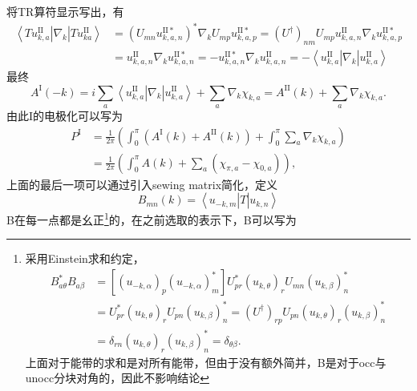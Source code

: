 \documentclass[10pt,openany]{book}
\theoremstyle{thmstyle} %
\theoremstyle{defstyle} %
\theoremstyle{prostyle} %
\begin{document}
将TR算符显示写出，有
\begin{equation*}
  \begin{aligned}
    \left\langle T u_{k, a}^{\mathrm{II}}\right| \nabla_k\left|T u_{k a}^{\mathrm{II}}\right\rangle & =\left(U_{m n} u_{k, a, n}^{\mathrm{II} *}\right)^* \nabla_k U_{m p} u_{k, a, p}^{\mathrm{II} *}=\left(U^{\dagger}\right)_{n m} U_{m p} u_{k, a, n}^{\mathrm{II}} \nabla_k u_{k, a, p}^{\mathrm{II} *} \\
    & =u_{k, a, n}^{\mathrm{II}} \nabla_k u_{k, a, n}^{\mathrm{II} *}=-u_{k, a, n}^{\mathrm{II} *} \nabla_k u_{k, a, n}^{\mathrm{II}}=-\left\langle u_{k, a}^{\mathrm{II}}\right| \nabla_k\left|u_{k, a}^{\mathrm{II}}\right\rangle
    \end{aligned}
\end{equation*}
最终
\begin{equation*}
  A^{\mathrm{I}}(-k)=i \sum_a\left\langle u_{k, a}^{\mathrm{II}}\right| \nabla_k\left|u_{k, a}^{\mathrm{II}}\right\rangle+\sum_a \nabla_k \chi_{k, a}=A^{\mathrm{II}}(k)+\sum_a \nabla_k \chi_{k, a} .
\end{equation*}
由此I的电极化可以写为
\begin{equation*}
  \begin{aligned}
    P^{\mathrm{I}} & =\frac{1}{2 \pi}\left(\int_0^\pi\left(A^{\mathrm{I}}(k)+A^{\mathrm{II}}(k)\right)+\int_0^\pi \sum_a \nabla_k \chi_{k, a}\right) \\
    & =\frac{1}{2 \pi}\left(\int_0^\pi A(k)+\sum_a\left(\chi_{\pi, a}-\chi_{0, a}\right)\right),
    \end{aligned}
\end{equation*}
上面的最后一项可以通过引入sewing matrix简化，定义
\begin{equation*}
  B_{m n}(k)=\left\langle u_{-k, m}\right| T\left|u_{k, n}\right\rangle
\end{equation*}
B在每一点都是幺正\footnote{采用Einstein求和约定， \begin{equation*}
  \begin{aligned}
    B_{a \theta}^* B_{a \beta} & =\left[\left(u_{-k, \alpha}\right)_p\left(u_{-k, \alpha}\right)_m^*\right] U_{p r}^*\left(u_{k, \theta}\right)_r U_{m n}\left(u_{k, \beta}\right)_n^* \\
    & =U_{p r}^*\left(u_{k, \theta}\right)_r U_{p n}\left(u_{k, \beta}\right)_n^*=\left(U^{\dagger}\right)_{r p} U_{p n}\left(u_{k, \theta}\right)_r\left(u_{k, \beta}\right)_n^* \\
    & =\delta_{r n}\left(u_{k, \theta}\right)_r\left(u_{k, \beta}\right)_n^*=\delta_{\theta \beta} .
    \end{aligned}
\end{equation*}上面对于能带的求和是对所有能带，但由于没有额外简并，B是对于occ与unocc分块对角的，因此不影响结论}的，在之前选取的表示下，B可以写为
\end{document}
